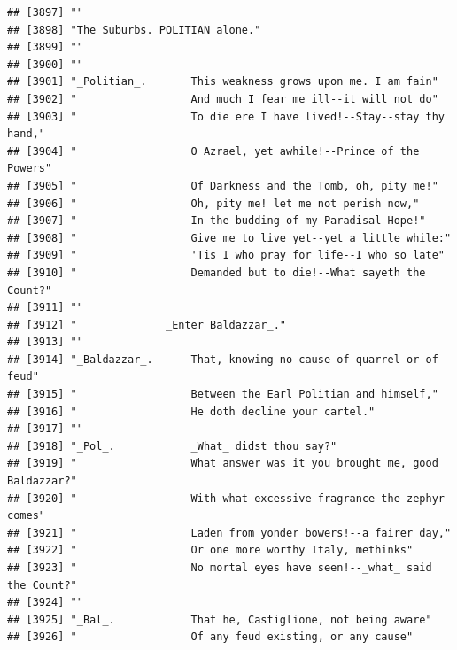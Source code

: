 \documentclass{article}\usepackage[]{graphicx}\usepackage[]{color}
\makeatletter
\newenvironment{kframe}{%
 \def\at@end@of@kframe{}%
 \ifinner\ifhmode%
  \def\at@end@of@kframe{\end{minipage}}%
  \begin{minipage}{\columnwidth}%
 \fi\fi%
 \def\FrameCommand##1{\hskip\@totalleftmargin \hskip-\fboxsep
 \colorbox{shadecolor}{##1}\hskip-\fboxsep
     \hskip-\linewidth \hskip-\@totalleftmargin \hskip\columnwidth}%
 \MakeFramed {\advance\hsize-\width
   \@totalleftmargin\z@ \linewidth\hsize
   \@setminipage}}%
 {\par\unskip\endMakeFramed%
 \at@end@of@kframe}
\newenvironment{knitrout}{}{} %
\makeatother
\begin{document}
\begin{knitrout}
\begin{kframe}
\begin{verbatim}
## [3897] ""                                                                            
## [3898] "The Suburbs. POLITIAN alone."                                                
## [3899] ""                                                                            
## [3900] ""                                                                            
## [3901] "_Politian_.       This weakness grows upon me. I am fain"                    
## [3902] "                  And much I fear me ill--it will not do"                    
## [3903] "                  To die ere I have lived!--Stay--stay thy hand,"            
## [3904] "                  O Azrael, yet awhile!--Prince of the Powers"               
## [3905] "                  Of Darkness and the Tomb, oh, pity me!"                    
## [3906] "                  Oh, pity me! let me not perish now,"                       
## [3907] "                  In the budding of my Paradisal Hope!"                      
## [3908] "                  Give me to live yet--yet a little while:"                  
## [3909] "                  'Tis I who pray for life--I who so late"                   
## [3910] "                  Demanded but to die!--What sayeth the Count?"              
## [3911] ""                                                                            
## [3912] "              _Enter Baldazzar_."                                            
## [3913] ""                                                                            
## [3914] "_Baldazzar_.      That, knowing no cause of quarrel or of feud"              
## [3915] "                  Between the Earl Politian and himself,"                    
## [3916] "                  He doth decline your cartel."                              
## [3917] ""                                                                            
## [3918] "_Pol_.            _What_ didst thou say?"                                    
## [3919] "                  What answer was it you brought me, good Baldazzar?"        
## [3920] "                  With what excessive fragrance the zephyr comes"            
## [3921] "                  Laden from yonder bowers!--a fairer day,"                  
## [3922] "                  Or one more worthy Italy, methinks"                        
## [3923] "                  No mortal eyes have seen!--_what_ said the Count?"         
## [3924] ""                                                                            
## [3925] "_Bal_.            That he, Castiglione, not being aware"                     
## [3926] "                  Of any feud existing, or any cause"                        

\end{verbatim}
\end{kframe}
\end{knitrout}
\end{document}
